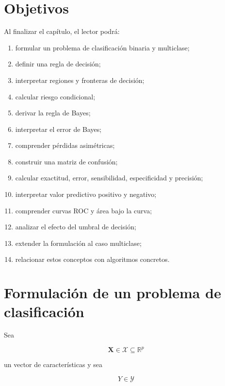 \documentclass[
  spanish,
  10.5pt,
  letterpaper,
  DIV=11,
  numbers=noendperiod,
  oneside,
  open=any]{scrreprt}
\providecommand{\tightlist}{%
  \setlength{\itemsep}{0pt}\setlength{\parskip}{0pt}}
\theoremstyle{definition}
\theoremstyle{definition}
\theoremstyle{plain}
\theoremstyle{remark}
\begin{document}
\section*{Objetivos}\label{objetivos-5}


Al finalizar el capítulo, el lector podrá:

\begin{enumerate}
\def\labelenumi{\arabic{enumi}.}
\tightlist
\item
  formular un problema de clasificación binaria y multiclase;
\item
  definir una regla de decisión;
\item
  interpretar regiones y fronteras de decisión;
\item
  calcular riesgo condicional;
\item
  derivar la regla de Bayes;
\item
  interpretar el error de Bayes;
\item
  comprender pérdidas asimétricas;
\item
  construir una matriz de confusión;
\item
  calcular exactitud, error, sensibilidad, especificidad y precisión;
\item
  interpretar valor predictivo positivo y negativo;
\item
  comprender curvas ROC y área bajo la curva;
\item
  analizar el efecto del umbral de decisión;
\item
  extender la formulación al caso multiclase;
\item
  relacionar estos conceptos con algoritmos concretos.
\end{enumerate}

\section*{Formulación de un problema de
clasificación}\label{formulaciuxf3n-de-un-problema-de-clasificaciuxf3n}


Sea

\[
\mathbf{X}\in\mathcal{X}\subseteq\mathbb{R}^{p}
\]

un vector de características y sea

\[
Y\in\mathcal{Y}
\]
\end{document}
